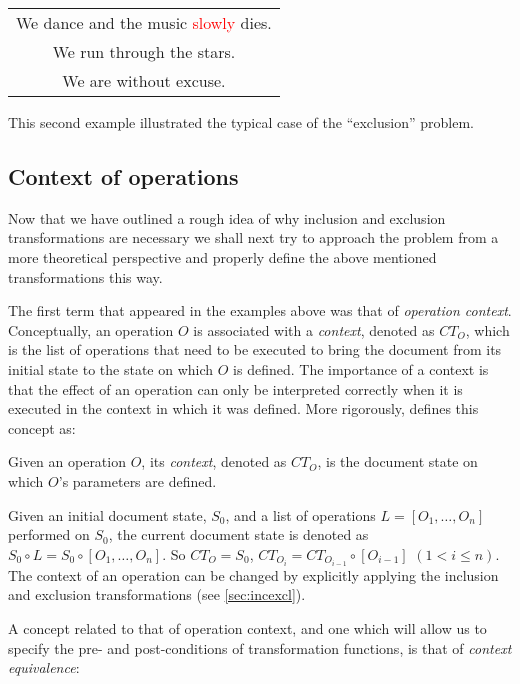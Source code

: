 \begin{center}
\begin{tabular}[c]{|c|}
\hline
We dance and the music \textcolor{red}{slowly} dies.\\
We run through the stars.\\
We are without excuse.\\
\hline
\end{tabular}
\end{center}

This second example illustrated the typical case of the ``exclusion'' problem.

\subsection{Context of operations}

Now that we have outlined a rough idea of why inclusion and exclusion transformations
are necessary we shall next try to approach the problem from a more theoretical
perspective and properly define the above mentioned transformations this way.

The first term that appeared in the examples above was that of \emph{operation
context}. Conceptually, an operation $O$ is associated with a \emph{context}, denoted
as $CT_{O}$, which is the list of operations that need to be executed to bring the
document from its initial state to the state on which $O$ is defined. The importance
of a context is that the effect of an operation can only be interpreted correctly
when it is executed in the context in which it was defined. More rigorously,
\cite{shen02} defines this concept as:

\begin{defi}
Given an operation $O$, its \emph{context}, denoted as $CT_{O}$, is the document
state on which $O$'s parameters are defined.
\end{defi}

Given an initial document state, $S_{0}$, and a list of operations $L=[O_{1},\ldots,O_{n}]$
performed on $S_{0}$, the current document state is denoted as $S_{0}\circ{}L=S_{0}\circ{}
[O_{1},\ldots,O_{n}]$. So $CT_{O}=S_{0}$, $CT_{O_{i}}=CT_{O_{i-1}}\circ{}[O_{i-1}]$ $(1 < i \leq{}n)$.
The context of an operation can be changed by explicitly applying the inclusion and
exclusion transformations (see \ref{sec:incexcl}).

A concept related to that of operation context, and one which will allow us to specify the
pre- and post-conditions of transformation functions, is that of \emph{context equivalence}:

